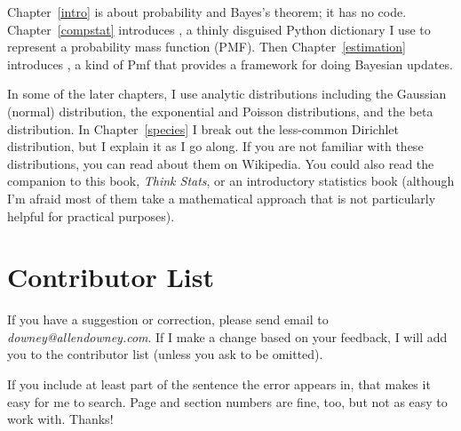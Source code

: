 \documentclass[12pt]{book}
\theoremstyle{exercise}
\begin{document}
Chapter~\ref{intro} is about probability and Bayes's theorem; it has
no code.  Chapter~\ref{compstat} introduces , a thinly disguised
Python dictionary I use to represent a probability mass function
(PMF).  Then Chapter~\ref{estimation} introduces , a kind
of Pmf that provides a framework for doing Bayesian updates.

In some of the later chapters, I use
analytic distributions including the Gaussian (normal) distribution,
the exponential and Poisson distributions, and the beta distribution.
In Chapter~\ref{species} I break out the less-common Dirichlet
distribution, but I explain it as I go along.  If you are not familiar
with these distributions, you can read about them on Wikipedia.  You
could also read the companion to this book, {\it Think Stats}, or an
introductory statistics book (although I'm afraid most of them take
a mathematical approach that is not particularly helpful for practical
purposes).



\section*{Contributor List}

If you have a suggestion or correction, please send email to 
{\it downey@allendowney.com}.  If I make a change based on your
feedback, I will add you to the contributor list
(unless you ask to be omitted).

If you include at least part of the sentence the
error appears in, that makes it easy for me to search.  Page and
section numbers are fine, too, but not as easy to work with.
Thanks!

\small
\end{document}

